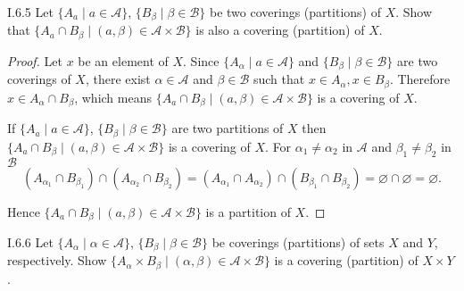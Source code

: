 \begin{problem}{I.6.5}
Let \(\{A_{a} \mid a \in \mathscr{A}\}\), \(\{B_{\beta} \mid \beta \in \mathscr{B}\}\) be two coverings (partitions) of \(X\). Show that \(\{A_{a} \cap B_{\beta} \mid (a, \beta) \in \mathscr{A} \times \mathscr{B}\}\) is also a covering (partition) of \(X\).
\end{problem}

\begin{proof}
	Let \( x \) be an element of \( X \). Since \( \{ A_{\alpha} \mid a \in \mathscr{A} \} \) and \(\{B_{\beta} \mid \beta \in \mathscr{B}\}\) are two coverings of \( X \), there exist \( \alpha \in \mathscr{A} \) and \( \beta \in \mathscr{B} \) such that \( x \in A_{\alpha}, x \in B_{\beta} \). Therefore \( x \in A_{\alpha} \cap B_{\beta} \), which means \(\{A_{a} \cap B_{\beta} \mid (a, \beta) \in \mathscr{A} \times \mathscr{B}\}\) is a covering of \(X\).

	If \(\{A_{a} \mid a \in \mathscr{A}\}\), \(\{B_{\beta} \mid \beta \in \mathscr{B}\}\) are two partitions of \(X\) then \(\{A_{a} \cap B_{\beta} \mid (a, \beta) \in \mathscr{A} \times \mathscr{B}\}\) is a covering of \(X\). For \( \alpha_{1} \ne \alpha_{2} \) in \( \mathscr{A} \) and \( \beta_{1} \ne \beta_{2} \) in \( \mathscr{B} \)
	\[
		(A_{\alpha_{1}} \cap B_{\beta_{1}}) \cap (A_{\alpha_{2}} \cap B_{\beta_{2}}) = (A_{\alpha_{1}} \cap A_{\alpha_{2}}) \cap (B_{\beta_{1}} \cap B_{\beta_{2}}) = \varnothing \cap \varnothing = \varnothing.
	\]

	Hence \(\{A_{a} \cap B_{\beta} \mid (a, \beta) \in \mathscr{A} \times \mathscr{B}\}\) is a partition of \(X\).
\end{proof}

\begin{problem}{I.6.6}
Let \(\{A_{\alpha} \mid \alpha \in \mathscr{A}\}\), \(\{B_{\beta} \mid \beta \in \mathscr{B}\}\) be coverings (partitions) of sets \(X\) and \(Y\), respectively. Show \(\{A_{\alpha} \times B_{\beta} \mid (\alpha, \beta) \in \mathscr{A} \times \mathscr{B}\}\) is a covering (partition) of \(X \times Y\).
\end{problem}

